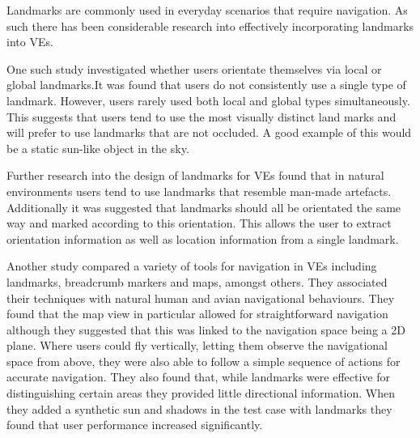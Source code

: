 \documentclass{sig-alternate-05-2015}
\begin{document}
Landmarks are commonly used in everyday scenarios that require navigation. As such there has been considerable research into effectively incorporating landmarks into VEs.

One such study investigated whether users orientate themselves via local or global landmarks\cite{Steck2000}.It was found that users do not consistently use a single type of landmark. However, users rarely used both local and global types simultaneously. This suggests that users tend to use the most visually distinct land marks and will prefer to use landmarks that are not occluded. A good example of this would be a static sun-like object in the sky. %

Further research into the design of landmarks for VEs found that in natural environments users tend to use landmarks that resemble man-made artefacts\cite{Vinson1999}. Additionally it was suggested that landmarks should all be orientated the same way and marked according to this orientation. This allows the user to extract orientation information as well as location information from a single landmark.

Another study compared a variety of tools for navigation in VEs including landmarks, breadcrumb markers and maps, amongst others\cite{Darken1993}. They associated their techniques with natural human and avian  navigational behaviours. They found that the map view in particular allowed for straightforward navigation although they suggested that this was linked to the navigation space being a 2D plane. Where users could fly vertically, letting them observe the navigational space from above, they were also able to follow a simple sequence of actions for accurate navigation. They also found that, while landmarks were effective for distinguishing certain areas they provided little directional information. When they added a synthetic sun and shadows in the test case with landmarks they found that user performance increased significantly. %
\end{document}
